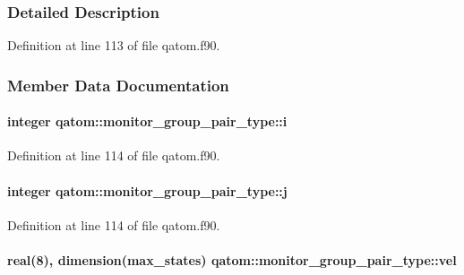 \subsubsection{Detailed Description}


Definition at line 113 of file qatom.\-f90.



\subsubsection{Member Data Documentation}
\hypertarget{structqatom_1_1monitor__group__pair__type_a78170d96a97b9e71422008ce82f5d6fa}{
\paragraph[{i}]{\setlength{\rightskip}{0pt plus 5cm}integer qatom\-::monitor\-\_\-group\-\_\-pair\-\_\-type\-::i}}\label{structqatom_1_1monitor__group__pair__type_a78170d96a97b9e71422008ce82f5d6fa}


Definition at line 114 of file qatom.\-f90.

\hypertarget{structqatom_1_1monitor__group__pair__type_a2a87bd4d819b0474ebdfc19c67b84afa}{
\paragraph[{j}]{\setlength{\rightskip}{0pt plus 5cm}integer qatom\-::monitor\-\_\-group\-\_\-pair\-\_\-type\-::j}}\label{structqatom_1_1monitor__group__pair__type_a2a87bd4d819b0474ebdfc19c67b84afa}


Definition at line 114 of file qatom.\-f90.

\hypertarget{structqatom_1_1monitor__group__pair__type_a1324bdf050d7a0fc7e2eb708cf317d02}{
\paragraph[{vel}]{\setlength{\rightskip}{0pt plus 5cm}real(8), dimension({\bf max\-\_\-states}) qatom\-::monitor\-\_\-group\-\_\-pair\-\_\-type\-::vel}}\label{structqatom_1_1monitor__group__pair__type_a1324bdf050d7a0fc7e2eb708cf317d02}


